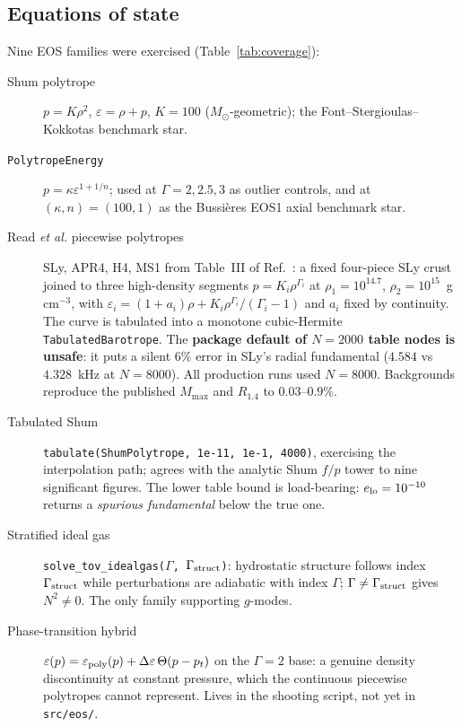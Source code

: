\documentclass[aps,prd,preprint,amsmath,amssymb,nofootinbib,longbibliography]{revtex4-2}
\newcommand{\Msun}{M_\odot}
\begin{document}
\subsection{Equations of state}
\label{sec:eos}
Nine EOS families were exercised (Table~\ref{tab:coverage}):
\begin{description}
\item[Shum polytrope] $p = K\rho^2$, $\varepsilon = \rho + p$, $K=100$ ($\Msun$-geometric); the
Font--Stergioulas--Kokkotas benchmark star.
\item[\texttt{PolytropeEnergy}] $p = \kappa\varepsilon^{1+1/n}$; used at $\Gamma = 2, 2.5, 3$ as
outlier controls, and at $(\kappa,n) = (100,1)$ as the Bussi\`eres EOS1 axial benchmark star.
\item[Read \emph{et al.} piecewise polytropes] SLy, APR4, H4, MS1 from Table~III of
Ref.~\cite{Read2009}: a fixed four-piece SLy crust joined to three high-density segments
$p = K_i\rho^{\Gamma_i}$ at $\rho_1 = 10^{14.7}$, $\rho_2 = 10^{15}$~g\,cm$^{-3}$, with
$\varepsilon_i = (1+a_i)\rho + K_i\rho^{\Gamma_i}/(\Gamma_i-1)$ and $a_i$ fixed by continuity.
The curve is tabulated into a monotone cubic-Hermite \texttt{TabulatedBarotrope}. The
\textbf{package default of $N=2000$ table nodes is unsafe}: it puts a silent $6\%$ error in
SLy's radial fundamental ($4.584$ vs $4.328$~kHz at $N=8000$). All production runs used
$N=8000$. Backgrounds reproduce the published $M_{\max}$ and $R_{1.4}$ to $0.03$--$0.9\%$.
\item[Tabulated Shum] \texttt{tabulate(ShumPolytrope,\,1e-11,\,1e-1,\,4000)}, exercising the
interpolation path; agrees with the analytic Shum $f/p$ tower to nine significant figures.
The lower table bound is load-bearing: $e_{\rm lo} = 10^{-10}$ returns a \emph{spurious
fundamental} below the true one.
\item[Stratified ideal gas] \texttt{solve\_tov\_idealgas($\Gamma$, $\Gamma_{\rm struct}$)}:
hydrostatic structure follows index $\Gamma_{\rm struct}$ while perturbations are adiabatic with
index $\Gamma$; $\Gamma \neq \Gamma_{\rm struct}$ gives $N^2 \neq 0$. The only family supporting
$g$-modes.
\item[Phase-transition hybrid] $\varepsilon(p) = \varepsilon_{\rm poly}(p) + \Delta\varepsilon\,
\Theta(p - p_t)$ on the $\Gamma=2$ base: a genuine density discontinuity at constant pressure,
which the continuous piecewise polytropes cannot represent. Lives in the shooting script, not
yet in \texttt{src/eos/}.
\end{description}
\end{document}
